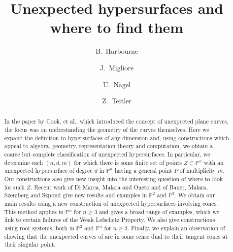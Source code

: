 \documentclass[12pt]{amsart}
\numberwithin{equation}{section}
\theoremstyle{definition}
\newcommand{\PP}{ \ensuremath{\mathbb{P}}}
\begin{document}
\title[Unexpected hypersurfaces and where to find them]{Unexpected hypersurfaces and where to find them}

\author{B.\ Harbourne}
\address{Department of Mathematics\\
University of Nebraska\\
Lincoln, NE 68588-0130 USA}

\author{J.\ Migliore} 
\address{Department of Mathematics \\
University of Notre Dame \\
Notre Dame, IN 46556 USA}

\author{U.\ Nagel}
\address{Department of Mathematics\\
University of Kentucky\\
715 Patterson Office Tower\\
Lexington, KY 40506-0027 USA}

\author{Z.\ Teitler}
\address{Department of Mathematics\\
Boise State University\\
1910 University Drive\\
Boise, ID 83725-1555, USA}

\begin{abstract} 
In the paper \cite{CHMN} by Cook, et al., which introduced the concept of unexpected plane curves,
the focus was on understanding the geometry of the curves themselves.
Here we expand the definition to hypersurfaces of any dimension
and, using constructions which appeal to algebra, geometry, representation 
theory and computation, we obtain a coarse but complete classification of 
unexpected hypersurfaces. In particular, 
we determine each $(n,d,m)$ for which there is some finite set of points $Z\subset\PP^n$
with an unexpected hypersurface of degree $d$ in $\PP^n$ having a 
general point $P$ of multiplicity $m$. 
Our constructions also give new insight into the interesting question of where to look for such $Z$. Recent 
work of Di Marca, Malara and Oneto \cite{DMO} and of Bauer, Malara, Szemberg and Szpond \cite{BMSS} give new results and 
examples in $\PP^2$ and  $\PP^3$. We obtain our main results using a new construction of unexpected hypersurfaces
involving cones.  
This method applies in $\PP^n$ for $n \geq 3$ and gives a broad range of examples, which we link to certain failures of the 
Weak Lefschetz Property. We also give constructions using root systems, both in $\PP^2$ and $\PP^n$ 
for $n \geq 3$. Finally, we explain an observation of \cite{BMSS}, showing that the unexpected curves of \cite{CHMN} are in 
some sense dual to their tangent cones at their singular point.
\end{abstract}
\end{document}
